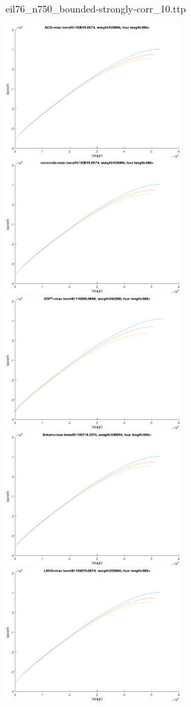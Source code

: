 \documentclass{article}
\begin{document}
\newpage
eil76\_n750\_bounded-strongly-corr\_10.ttp

\noindent
\includegraphics[width=0.5\textwidth]{eil76figs/eil76_n750_bounded-strongly-corr_10.ttp.aco.txt.atsf.eps}
\includegraphics[width=0.5\textwidth]{eil76figs/eil76_n750_bounded-strongly-corr_10.ttp.con.txt.atsf.eps}
\includegraphics[width=0.5\textwidth]{eil76figs/eil76_n750_bounded-strongly-corr_10.ttp.inv.txt.atsf.eps}
\includegraphics[width=0.5\textwidth]{eil76figs/eil76_n750_bounded-strongly-corr_10.ttp.lkh.txt.atsf.eps}
\includegraphics[width=0.5\textwidth]{eil76figs/eil76_n750_bounded-strongly-corr_10.ttp.lkh2.txt.atsf.eps}
\end{document}
